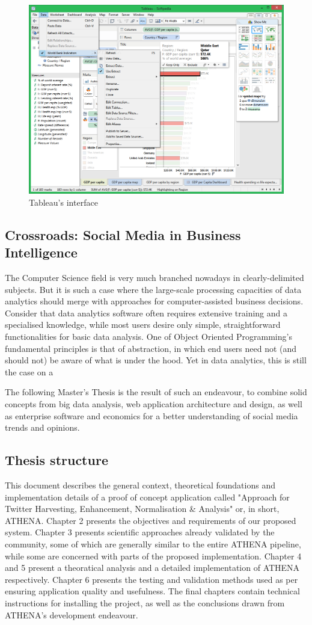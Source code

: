 \begin{figure}[ht]
    \centering
\includegraphics[width=0.7\columnwidth]{img/Tableau-Desktop_3.png}
    \caption{Tableau's interface}
    \label{fig:tableau}
\end{figure}

\subsection{Crossroads: Social Media in Business Intelligence}
The Computer Science field is very much branched nowadays in clearly-delimited subjects. But it is such a case where the large-scale processing capacities of data analytics should merge with approaches for computer-assisted business decisions. Consider that data analytics software often requires extensive training and a specialised knowledge, while most users desire only simple, straightforward functionalities for basic data analysis. One of Object Oriented Programming's fundamental principles is that of abstraction, in which end users need not (and should not) be aware of what is under the hood. Yet in data analytics, this is still the case on a 

The following Master's Thesis is the result of such an endeavour, to combine solid concepts from big data analysis, web application architecture and design, as well as enterprise software and economics for a better understanding of social media trends and opinions.

\subsection*{Thesis structure}
This document describes the general context, theoretical foundations and implementation details of a proof of concept application called "Approach for Twitter Harvesting, Enhancement, Normalisation \& Analysis" or, in short, ATHENA. Chapter 2 presents the objectives and requirements of our proposed system. Chapter 3 presents scientific approaches already validated by the community, some of which are generally similar to the entire ATHENA pipeline, while some are concerned with parts of the proposed implementation. Chapter 4 and 5 present a theoratical analysis and a detailed implementation of ATHENA respectively. Chapter 6 presents the testing and validation methods used as per ensuring application quality and usefulness. The final chapters contain technical instructions for installing the project, as well as the conclusions drawn from ATHENA's development endeavour.